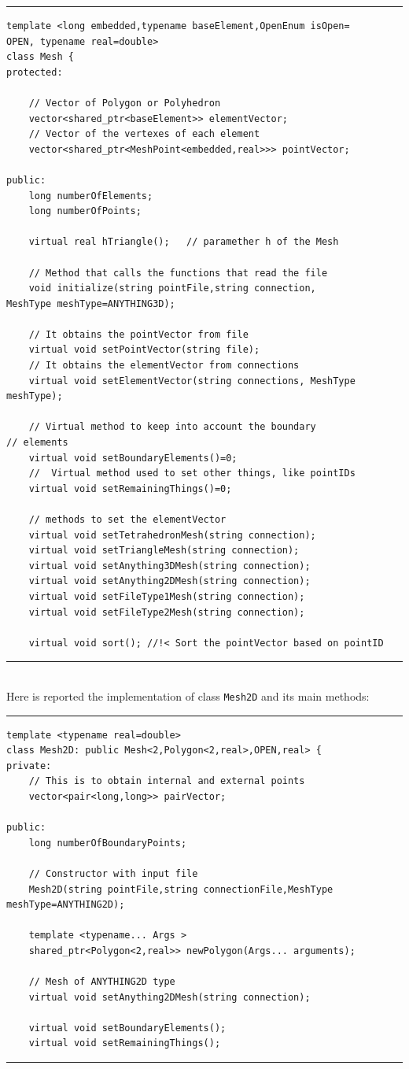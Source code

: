 \noindent\rule{16cm}{1pt}
\begin{lstlisting}[caption=File \texttt{Mesh.h}]
template <long embedded,typename baseElement,OpenEnum isOpen=
OPEN, typename real=double>
class Mesh {
protected:
    
    // Vector of Polygon or Polyhedron
    vector<shared_ptr<baseElement>> elementVector;	
    // Vector of the vertexes of each element
    vector<shared_ptr<MeshPoint<embedded,real>>> pointVector;	
	
public:
    long numberOfElements;
    long numberOfPoints;

    virtual real hTriangle();	// paramether h of the Mesh
	
    // Method that calls the functions that read the file
    void initialize(string pointFile,string connection,
MeshType meshType=ANYTHING3D);

    // It obtains the pointVector from file
    virtual void setPointVector(string file);	
    // It obtains the elementVector from connections
    virtual void setElementVector(string connections, MeshType
meshType);
    
    // Virtual method to keep into account the boundary 
// elements
    virtual void setBoundaryElements()=0;
    //	Virtual method used to set other things, like pointIDs
    virtual void setRemainingThings()=0;

    // methods to set the elementVector
    virtual void setTetrahedronMesh(string connection); 
    virtual void setTriangleMesh(string connection);	
    virtual void setAnything3DMesh(string connection);
    virtual void setAnything2DMesh(string connection);
    virtual void setFileType1Mesh(string connection);
    virtual void setFileType2Mesh(string connection);

    virtual void sort(); //!< Sort the pointVector based on pointID
\end{lstlisting}

\noindent\rule{16cm}{1pt}\\

Here is reported the implementation of class \verb|Mesh2D| and its main methods:

\noindent\rule{16cm}{1pt}
\begin{lstlisting}[caption=File \texttt{Mesh2D.h}]
template <typename real=double>
class Mesh2D: public Mesh<2,Polygon<2,real>,OPEN,real> {
private:
    // This is to obtain internal and external points	
    vector<pair<long,long>> pairVector;

public:
    long numberOfBoundaryPoints;
	
    // Constructor with input file
    Mesh2D(string pointFile,string connectionFile,MeshType 
meshType=ANYTHING2D);

    template <typename... Args >
    shared_ptr<Polygon<2,real>> newPolygon(Args... arguments);

    // Mesh of ANYTHING2D type
    virtual void setAnything2DMesh(string connection);

    virtual void setBoundaryElements();
    virtual void setRemainingThings();
\end{lstlisting}
\noindent\rule{16cm}{1pt}\\

